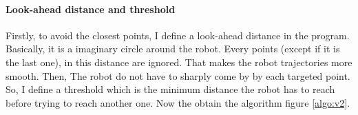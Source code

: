 \paragraph{Look-ahead distance and threshold}{
    Firstly, to avoid the closest points, I define a look-ahead distance in the
 program. Basically, it is a imaginary circle around the robot. Every points
 (except if it is the last one), in this distance are ignored. That makes the
 robot trajectories more smooth. Then, The robot do not have to sharply come by
 by each targeted point. So, I define a threshold which is the minimum distance
 the robot has to reach before trying to reach another one. Now the obtain the
 algorithm figure \ref{algo:v2}.
}

